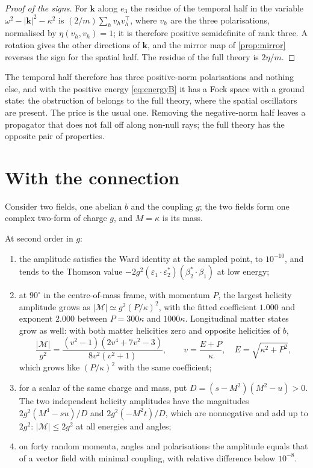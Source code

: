 \begin{proof}[Proof of the signs]
For $\mathbf k$ along $e_3$ the residue of the temporal half in the variable $\omega^2-|\mathbf k|^2-\kappa^2$ is
$(2/m)\sum_hv_hv_h^\top$, where $v_h$ are the three polarisations, normalised by $\eta(v_h,v_h)=1$; it is therefore positive semidefinite of
rank three. A rotation gives the other directions of $\mathbf k$, and the mirror map of \cref{prop:mirror} reverses the sign for the spatial
half. The residue of the full theory is $2\eta/m$.
\end{proof}

The temporal half therefore has three positive-norm polarisations and nothing else, and with the positive energy \cref{eq:energyB} it has a
Fock space with a ground state: the obstruction of  belongs to the full theory, where the spatial oscillators are present.
The price is the usual one. Removing the negative-norm half leaves a propagator that does not fall off along non-null rays; the full theory
has the opposite pair of properties.

\section{With the connection}

Consider two fields, one abelian $b$ and the coupling $g$; the two fields form one complex two-form of charge $g$, and
$M=\kappa$ is its mass.

\begin{theorem}
\label{thm:compton}
At second order in $g$:
\begin{enumerate}[label=(\roman*),leftmargin=2.2em,itemsep=1pt]
\item the amplitude satisfies the Ward identity at the sampled point, to $10^{-10}$, and tends to the Thomson value
$-2g^2(\varepsilon_1\!\cdot\!\varepsilon_2^*)(\beta_2^*\!\cdot\!\beta_1)$ at low energy;
\item at $90^\circ$ in the centre-of-mass frame, with momentum $P$, the largest helicity amplitude grows as $|\mathcal M|\simeq g^2(P/\kappa)^2$,
with the fitted coefficient $1.000$ and exponent $2.000$ between $P=300\kappa$ and $1000\kappa$. Longitudinal matter states grow as well:
with both matter helicities zero and opposite helicities of $b$,
\[
\frac{|\mathcal M|}{g^2}=\frac{(v^2-1)(2v^4+7v^2-3)}{8v^2(v^2+1)},\qquad v=\frac{E+P}{\kappa},\quad E=\sqrt{\kappa^2+P^2},
\]
which grows like $(P/\kappa)^2$ with the same coefficient;
\item for a scalar of the same charge and mass, put $D=(s-M^2)(M^2-u)>0$. The two independent helicity amplitudes have the magnitudes
$2g^2(M^4-su)/D$ and $2g^2(-M^2t)/D$, which are nonnegative and add up to $2g^2$: $|\mathcal M|\le2g^2$ at all energies and angles;
\item on forty random momenta, angles and polarisations the amplitude equals that of a vector field with minimal coupling, with relative
difference below $10^{-8}$.
\end{enumerate}
\end{theorem}

